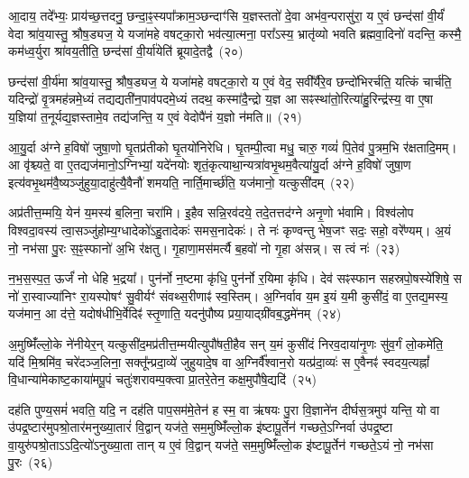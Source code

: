आ॒दाय॒ तदे᳚भ्यः॒ प्राय॑च्छ॒त्तदनु॒ छन्दा॒ꣴ॒स्यपा᳚क्राम॒ञ्छन्दाꣳ॑सि य॒ज्ञस्ततो॑ दे॒वा अभ॑व॒न्परासु॑रा॒ य ए॒वं छन्द॑सां वी॒र्यं॑ वेदा श्रा॑व॒यास्तु॒ श्रौष॒ड्यज॒ ये यजा॑महे वषट्का॒रो भव॑त्या॒त्मना॒ परा᳚\-ऽस्य॒ भ्रातृ॑व्यो भवति ब्रह्मवा॒दिनो॑ वदन्ति॒ कस्मै॒ कम॑ध्व॒र्युरा श्रा॑वय॒तीति॒ छन्द॑सां वी॒र्या॑येति॑ ब्रूयादे॒तद्वै~(२०)

छन्द॑सां वी॒र्य॑मा श्रा॑व॒यास्तु॒ श्रौष॒ड्यज॒ ये यजा॑महे वषट्का॒रो य ए॒वं वेद॒ सवी᳚र्यैरे॒व छन्दो॑भिरर्चति॒ यत्किं चार्च॑ति॒ यदिन्द्रो॑ वृ॒त्रमह॑न्नमे॒ध्यं तद्यद्यती॑न॒पाव॑पदमे॒ध्यं तदथ॒ कस्मा॑दै॒न्द्रो य॒ज्ञ आ सꣴस्था॑तो॒रित्या॑हु॒रिन्द्र॑स्य॒ वा ए॒षा य॒ज्ञिया॑ त॒नूर्यद्य॒ज्ञस्तामे॒व तद्य॑जन्ति॒ य ए॒वं वेदोपै॑नं य॒ज्ञो न॑मति॥~(२१)

{\anuvakamend[{स छन्द॑सां वी॒र्यं॑ वा ए॒व तद॒ष्टौ च॑}]}%

आ॒यु॒र्दा अ॑ग्ने ह॒विषो॑ जुषा॒णो घृ॒तप्र॑तीको घृ॒तयो॑निरेधि। घृ॒तम्पी॒त्वा मधु॒ चारु॒ गव्यं॑ पि॒तेव॑ पु॒त्रम॒भि र॑क्षतादि॒मम्। आ वृ॑श्च्यते॒ वा ए॒तद्यज॑मानो॒\-ऽग्निभ्यां॒ यदे॑नयोः शृतं॒कृत्याथा॒न्यत्रा॑वभृ॒थम॒वैत्या॑यु॒र्दा अ॑ग्ने ह॒विषो॑ जुषा॒ण इत्य॑वभृ॒थम॑वै॒ष्यञ्जु॑हुया॒दाहु॑त्यै॒वैनौ॑ शमयति॒ नार्ति॒मार्च्छ॑ति॒ यज॑मानो॒ यत्कुसी॑दम्~(२२)

अप्र॑तीत्त॒म्मयि॒ येन॑ य॒मस्य॑ ब॒लिना॒ चरा॑मि। इ॒हैव सन्नि॒रव॑दये॒ तदे॒तत्तद॑ग्ने अनृ॒णो भ॑वामि। विश्व॑लोप विश्वदा॒वस्य॑ त्वा॒सञ्जु॑होम्य॒ग्धादेको॑\-ऽहु॒तादेकः॑ समस॒नादेकः॑। ते नः॑ कृण्वन्तु भेष॒जꣳ सदः॒ सहो॒ वरे᳚ण्यम्। अ॒यं नो॒ नभ॑सा पु॒रः स॒ꣴ॒स्फानो॑ अ॒भि र॑क्षतु। गृ॒हाणा॒मस॑मर्त्यै ब॒हवो॑ नो गृ॒हा अ॑सन्न्। स त्वं नः॑~(२३)

न॒भ॒स॒स्प॒त॒ ऊर्जं॑ नो धेहि भ॒द्रया᳚। पुन॑र्नो न॒ष्टमा कृ॑धि॒ पुन॑र्नो र॒यिमा कृ॑धि। देव॑ सꣴस्फान सहस्रपो॒षस्ये॑शिषे॒ स नो॑ रा॒स्वाज्या॑निꣳ रा॒यस्पोषꣳ॑ सु॒वीर्यꣳ॑ संवथ्स॒रीणाꣴ॑ स्व॒स्तिम्। अ॒ग्निर्वाव य॒म इ॒यं य॒मी कुसी॑दं॒ वा ए॒तद्य॒मस्य॒ यज॑मान॒ आ द॑त्ते॒ यदोष॑धीभि॒र्वेदिꣴ॑ स्तृ॒णाति॒ यदनु॑पौष्य प्रया॒याद्ग्री॑वब॒द्धमे॑नम्~(२४)

अ॒मुष्मिँ॑ल्लो॒के ने॑नीयेर॒न् यत्कुसी॑द॒मप्र॑तीत्त॒म्मयीत्युपौ॑षती॒हैव सन् य॒मं कुसी॑दं निरव॒दाया॑नृ॒णः सु॑व॒र्गं लो॒कमे॑ति॒ यदि॑ मि॒श्रमि॑व॒ चरे॑दञ्ज॒लिना॒ सक्तू᳚न्प्रदा॒व्ये॑ जुहुयादे॒ष वा अ॒ग्निर्वै᳚श्वान॒रो यत्प्र॑दा॒व्यः॑ स ए॒वैनꣴ॑ स्वदय॒त्यह्नां᳚ वि॒धान्या॑मेकाष्ट॒काया॑मपू॒पं चतुः॑शरावम्प॒क्त्वा प्रा॒तरे॒तेन॒ कक्ष॒मुपौ॑षे॒द्यदि॑~(२५)

दह॑ति पुण्य॒समं॑ भवति॒ यदि॒ न दह॑ति पाप॒सम॑मे॒तेन॑ ह स्म॒ वा ऋ॑षयः पु॒रा वि॒ज्ञाने॑न दीर्घस॒त्रमुप॑ यन्ति॒ यो वा उ॑पद्र॒ष्टार॑मुपश्रो॒तार॑मनुख्या॒तारं॑ वि॒द्वान् यज॑ते॒ सम॒मुष्मिँ॑ल्लो॒क इ॑ष्टापू॒र्तेन॑ गच्छते॒\-ऽग्निर्वा उ॑पद्र॒ष्टा वा॒युरु॑पश्रो॒ता\-ऽ\-ऽ\-दि॒त्यो॑\-ऽनुख्या॒ता तान् य ए॒वं वि॒द्वान् यज॑ते॒ सम॒मुष्मिँ॑ल्लो॒क इ॑ष्टापू॒र्तेन॑ गच्छते॒\-ऽयं नो॒ नभ॑सा पु॒रः~(२६)

